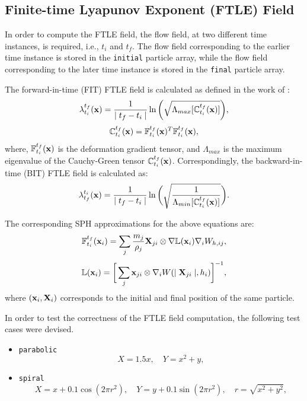 \subsection{Finite-time Lyapunov Exponent (FTLE) Field}

In order to compute the FTLE field, the flow field, at two different time instances, is required, i.e., $t_i$ and $t_f$.
The flow field corresponding to the earlier time instance is stored in the \texttt{initial} particle array, while the flow field corresponding to the later time instance is stored in the \texttt{final} particle array.

The forward-in-time (FIT) FTLE field is calculated as defined in the work of \cite{sun2016detection}:
\begin{equation}
	\lambda_{t_i}^{t_f}(\mathbf{x}) = \frac{1}{\mid t_f - t_i \mid} \ln \bigg( \sqrt{\Lambda_{max}[ \mathbb{C}_{t_i}^{t_f}(\mathbf{x}) ]}  \bigg),
\end{equation}
\begin{equation}
  \mathbb{C}_{t_i}^{t_f}(\mathbf{x}) = \mathbb{F}_{t_i}^{t_f}(\mathbf{x})^T \mathbb{F}_{t_i}^{t_f}(\mathbf{x}),
\end{equation}
where, $\mathbb{F}_{t_i}^{t_f}(\mathbf{x})$ is the deformation gradient tensor, and $\Lambda_{max}$ is the maximum eigenvalue of the Cauchy-Green tensor $\mathbb{C}_{t_i}^{t_f}(\mathbf{x})$. Correspondingly, the backward-in-time (BIT) FTLE field is calculated as:
\begin{equation}
  \lambda_{t_f}^{t_i}(\mathbf{x}) = \frac{1}{\mid t_f - t_i \mid} \ln \bigg( \sqrt{ \frac{1}{\Lambda_{min}[ \mathbb{C}_{t_i}^{t_f}(\mathbf{x}) ]} }  \bigg).
\end{equation}

The corresponding SPH approximations for the above equations are:
\begin{equation}
  \mathbb{F}_{t_i}^{t_f}(\mathbf{x}_i) = \sum_{j} \frac{m_j}{\rho_j} \mathbf{X}_{ji} \otimes \nabla \mathbb{L}( \mathbf{x}_i ) \nabla_{i} W_{h, ij},
\end{equation}
\begin{equation}
  \mathbb{L}( \mathbf{x}_i ) = \bigg[ \sum_j \mathbf{x}_{ji} \otimes \nabla_i W(\mid \mathbf{X}_{ji} \mid, h_i) \bigg]^{-1},
\end{equation}
where $(\mathbf{x}_i, \mathbf{X}_i)$ corresponds to the initial and final position of the same particle.

In order to test the correctness of the FTLE field computation, the following test cases were devised.
\begin{itemize}
  \item \texttt{parabolic}
  \begin{equation}
    X = 1.5x, \quad Y = x^2 + y,
  \end{equation}

  \item \texttt{spiral}
  \begin{equation}
    X = x + 0.1 \cos(2 \pi r^2), \quad Y = y + 0.1 \sin(2 \pi r^2), \quad r = \sqrt{x^2 + y^2},
    \end{equation}
\end{itemize}

